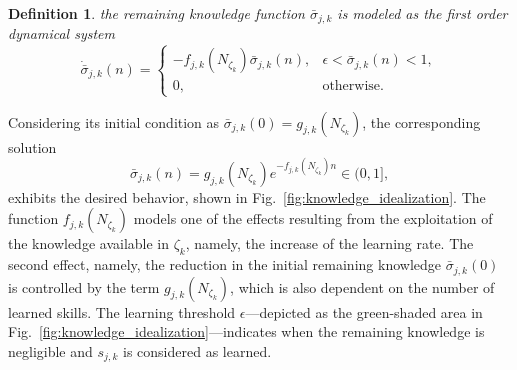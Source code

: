 \documentclass[12pt]{article}
\newtheorem{definition}{Definition}
\begin{document}
\begin{definition}\label{assumption:ode_model} the remaining knowledge function $\bar{\sigma}_{j,k}$ is modeled as the first order dynamical system
	\begin{equation}\label{eq:simple_knowledge_dynamics}
		\dot{\bar{\sigma}}_{j,k}\left(n\right)=\begin{cases}
			-f_{j,k} \left(N_{\zeta_k} \right) \bar{\sigma}_{j,k}\left(n\right), & \epsilon < \bar{\sigma}_{j,k}\left(n\right) < 1, \\
			0, & \text{otherwise}.
		\end{cases}
	\end{equation}	
\end{definition}
\noindent Considering its initial condition as $\bar{\sigma}_{j,k}(0) =  g_{j,k} \left(N_{\zeta_k}\right)$, the corresponding solution
\begin{equation}\label{eq:knowledge_exponential_form}
	\bar{\sigma}_{j,k}(n) = g_{j,k}(N_{\zeta_k}) e ^{-f_{j,k}\left(N_{\zeta_k}\right) n} \in (0,1],
\end{equation}
exhibits the desired behavior, shown in Fig.~\ref{fig:knowledge_idealization}. The function $f_{j,k}\left(N_{\zeta_k}\right)$ models one of the effects resulting from the exploitation of the knowledge available in $\zeta_k$, namely, the increase of the learning rate. The second effect, namely, the reduction in the initial remaining knowledge $\bar{\sigma}_{j,k}(0)$ is controlled by the term $g_{j,k}\left(N_{\zeta_k}\right)$, which is also dependent on the number of learned skills. The learning threshold $\epsilon$---depicted as the green-shaded area in Fig.~\ref{fig:knowledge_idealization}---indicates when the remaining knowledge is negligible and $s_{j,k}$ is considered as learned.

\end{document}
